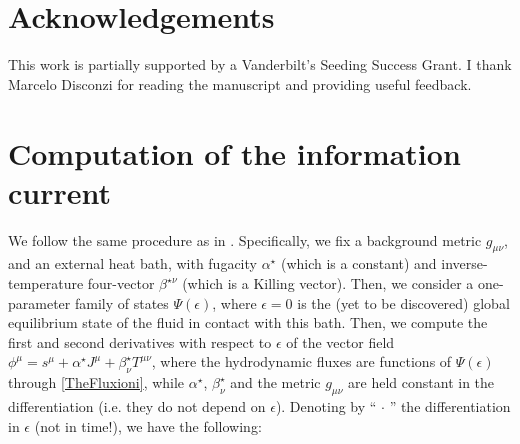 \documentclass[a4paper, amsfonts, amssymb, amsmath, reprint, showkeys, nofootinbib, twoside,notitlepage,onecolumn]{revtex4-2}
\theoremstyle{definition}
\theoremstyle{theorem}
\theoremstyle{corollary}
\begin{document}
\section*{Acknowledgements}

This work is partially supported by a Vanderbilt's Seeding Success Grant. I thank Marcelo Disconzi for reading the manuscript and providing useful feedback.


\appendix

\section{Computation of the information current}\label{appInfinuzzo}

We follow the same procedure as in \cite{GavassinoGENERIC2022,GavassinoStabilityCarter2022,GavassinoUniversalityII2023}. Specifically, we fix a background metric $g_{\mu \nu}$, and an external heat bath, with fugacity $\alpha^\star$ (which is a constant) and inverse-temperature four-vector $\beta^{\star \nu}$ (which is a Killing vector). Then, we consider a one-parameter family of states $\Psi(\epsilon)$, where $\epsilon=0$ is the (yet to be discovered) global equilibrium state of the fluid in contact with this bath. Then, we compute the first and second derivatives with respect to $\epsilon$ of the vector field $\phi^\mu=s^\mu +\alpha^\star J^\mu+\beta^\star_\nu T^{\mu \nu}$, where the hydrodynamic fluxes are functions of $\Psi(\epsilon)$ through \eqref{TheFluxioni}, while $\alpha^\star$, $\beta^\star_\nu$ and the metric $g_{\mu \nu}$ are held constant in the differentiation (i.e. they do not depend on $\epsilon$). Denoting by ``$\, \cdot \,$'' the differentiation in $\epsilon$ (not in time!), we have the following:
\end{document}
